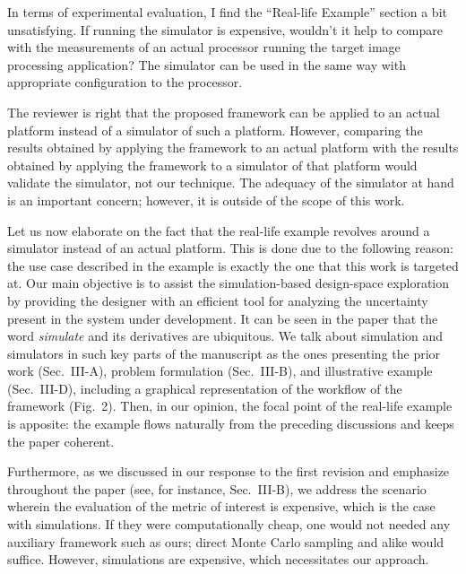 \begin{reviewer}
In terms of experimental evaluation, I find the ``Real-life Example'' section a
bit unsatisfying. If running the simulator is expensive, wouldn't it help to
compare with the measurements of an actual processor running the target image
processing application? The simulator can be used in the same way with
appropriate configuration to the processor.
\end{reviewer}

\begin{authors}
The reviewer is right that the proposed framework can be applied to an actual
platform instead of a simulator of such a platform. However, comparing the
results obtained by applying the framework to an actual platform with the
results obtained by applying the framework to a simulator of that platform would
validate the simulator, not our technique. The adequacy of the simulator at hand
is an important concern; however, it is outside of the scope of this work.

Let us now elaborate on the fact that the real-life example revolves around a
simulator instead of an actual platform. This is done due to the following
reason: the use case described in the example is exactly the one that this work
is targeted at. Our main objective is to assist the simulation-based
design-space exploration by providing the designer with an efficient tool for
analyzing the uncertainty present in the system under development. It can be
seen in the paper that the word \emph{simulate} and its derivatives are
ubiquitous. We talk about simulation and simulators in such key parts of the
manuscript as the ones presenting the prior work (Sec.~III-A), problem
formulation (Sec.~III-B), and illustrative example (Sec.~III-D), including a
graphical representation of the workflow of the framework (Fig.~2). Then, in our
opinion, the focal point of the real-life example is apposite: the example flows
naturally from the preceding discussions and keeps the paper coherent.

Furthermore, as we discussed in our response to the first revision and emphasize
throughout the paper (see, for instance, Sec.~III-B), we address the scenario
wherein the evaluation of the metric of interest is expensive, which is the case
with simulations. If they were computationally cheap, one would not needed any
auxiliary framework such as ours; direct Monte Carlo sampling and alike would
suffice. However, simulations are expensive, which necessitates our approach.
\end{authors}

